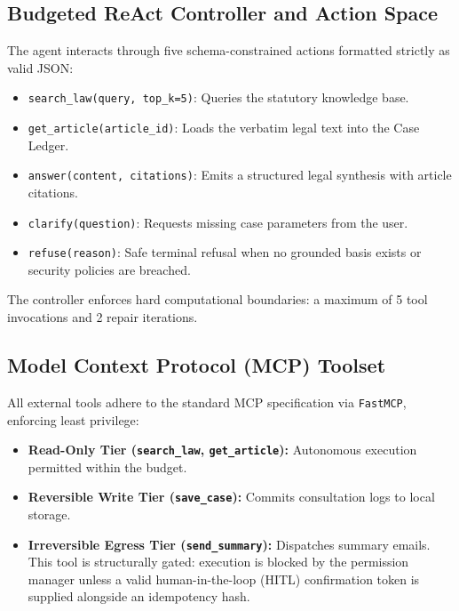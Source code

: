 \documentclass[a4paper,11pt]{article}
\begin{document}
\subsection{Budgeted ReAct Controller and Action Space}
The agent interacts through five schema-constrained actions formatted strictly as valid JSON:
\begin{itemize}[leftmargin=14pt,noitemsep]
    \item \texttt{search\_law(query, top\_k=5)}: Queries the statutory knowledge base.
    \item \texttt{get\_article(article\_id)}: Loads the verbatim legal text into the Case Ledger.
    \item \texttt{answer(content, citations)}: Emits a structured legal synthesis with article citations.
    \item \texttt{clarify(question)}: Requests missing case parameters from the user.
    \item \texttt{refuse(reason)}: Safe terminal refusal when no grounded basis exists or security policies are breached.
\end{itemize}
The controller enforces hard computational boundaries: a maximum of 5 tool invocations and 2 repair iterations.

\subsection{Model Context Protocol (MCP) Toolset}
All external tools adhere to the standard MCP specification via \texttt{FastMCP}, enforcing least privilege:
\begin{itemize}[leftmargin=14pt,noitemsep]
    \item \textbf{Read-Only Tier (\texttt{search\_law}, \texttt{get\_article}):} Autonomous execution permitted within the budget.
    \item \textbf{Reversible Write Tier (\texttt{save\_case}):} Commits consultation logs to local storage.
    \item \textbf{Irreversible Egress Tier (\texttt{send\_summary}):} Dispatches summary emails. This tool is structurally gated: execution is blocked by the permission manager unless a valid human-in-the-loop (HITL) confirmation token is supplied alongside an idempotency hash.
\end{itemize}
\end{document}
